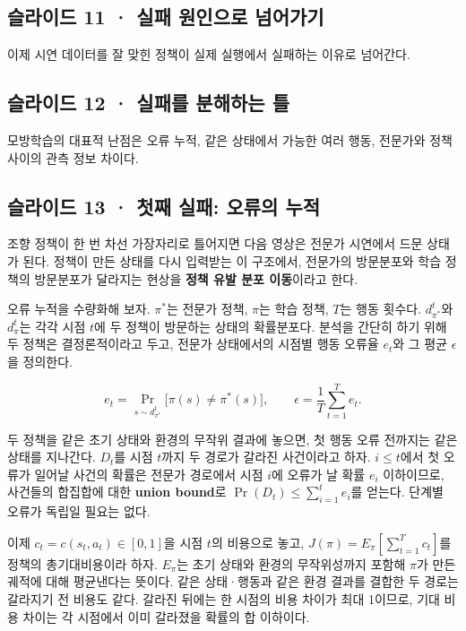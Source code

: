 \documentclass[11pt,a4paper]{article}
\begin{document}
\subsection{슬라이드 11 · 실패 원인으로 넘어가기}

이제 시연 데이터를 잘 맞힌 정책이 실제 실행에서 실패하는 이유로 넘어간다.\par

\subsection{슬라이드 12 · 실패를 분해하는 틀}

모방학습의 대표적 난점은 오류 누적, 같은 상태에서 가능한 여러 행동, 전문가와 정책 사이의 관측 정보 차이다.\par

\subsection{슬라이드 13 · 첫째 실패: 오류의 누적}

조향 정책이 한 번 차선 가장자리로 틀어지면 다음 영상은 전문가 시연에서 드문 상태가 된다. 정책이 만든 상태를 다시 입력받는 이 구조에서, 전문가의 방문분포와 학습 정책의 방문분포가 달라지는 현상을 \textbf{정책 유발 분포 이동}이라고 한다.\par

오류 누적을 수량화해 보자. $\pi^*$는 전문가 정책, $\pi$는 학습 정책, $T$는 행동 횟수다. $d_{\pi^*}^t$와 $d_\pi^t$는 각각 시점 $t$에 두 정책이 방문하는 상태의 확률분포다. 분석을 간단히 하기 위해 두 정책은 결정론적이라고 두고, 전문가 상태에서의 시점별 행동 오류율 $e_t$와 그 평균 $\epsilon$을 정의한다.\par

\[
e_t=\Pr_{s\sim d_{\pi^*}^t}\!\bigl[\pi(s)\ne\pi^*(s)\bigr],
\qquad \epsilon=\frac1T\sum_{t=1}^T e_t.
\]

두 정책을 같은 초기 상태와 환경의 무작위 결과에 놓으면, 첫 행동 오류 전까지는 같은 상태를 지나간다. $D_t$를 시점 $t$까지 두 경로가 갈라진 사건이라고 하자. $i\le t$에서 첫 오류가 일어날 사건의 확률은 전문가 경로에서 시점 $i$에 오류가 날 확률 $e_i$ 이하이므로, 사건들의 합집합에 대한 \textbf{union bound}로 $\Pr(D_t)\le\sum_{i=1}^t e_i$를 얻는다. 단계별 오류가 독립일 필요는 없다.\par

이제 $c_t=c(s_t,a_t)\in[0,1]$을 시점 $t$의 비용으로 놓고, $J(\pi)=E_\pi[\sum_{t=1}^T c_t]$를 정책의 총기대비용이라 하자. $E_\pi$는 초기 상태와 환경의 무작위성까지 포함해 $\pi$가 만든 궤적에 대해 평균낸다는 뜻이다. 같은 상태·행동과 같은 환경 결과를 결합한 두 경로는 갈라지기 전 비용도 같다. 갈라진 뒤에는 한 시점의 비용 차이가 최대 1이므로, 기대 비용 차이는 각 시점에서 이미 갈라졌을 확률의 합 이하이다.\par
\end{document}
